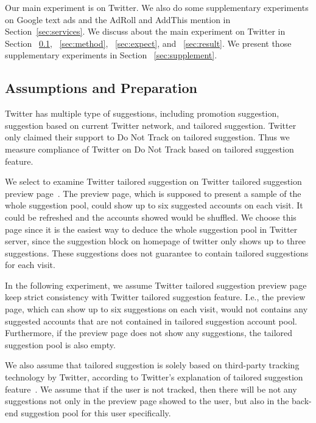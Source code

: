 \documentclass{sig-alternate}
\begin{document}
Our main experiment is on Twitter. We also do some supplementary experiments on Google text ads and the AdRoll and AddThis mention in Section~\ref{sec:services}. We discuss about the main experiment on Twitter in Section ~\ref{sec:pre}, ~\ref{sec:method}, ~\ref{sec:expect}, and ~\ref{sec:result}. We present those supplementary experiments in Section ~\ref{sec:supplement}. 

\subsection{Assumptions and Preparation} \label{sec:pre}

Twitter has multiple type of suggestions, including promotion suggestion, suggestion based on current Twitter network, and tailored suggestion. Twitter only claimed their support to Do Not Track on tailored suggestion. Thus we measure compliance of Twitter on Do Not Track based on tailored suggestion feature.

We select to examine Twitter tailored suggestion on Twitter tailored suggestion preview page~\cite{twittertailoredpreview}. The preview page, which is supposed to present a sample of the whole suggestion pool, could show up to six suggested accounts on each visit. It could be refreshed and the accounts showed would be shuffled. We choose this page since it is the easiest way to deduce the whole suggestion pool in Twitter server, since the suggestion block on homepage of twitter only shows up to three suggestions. These suggestions does not guarantee to contain tailored suggestions for each visit.

In the following experiment, we assume Twitter tailored suggestion preview page~\cite{twittertailoredpreview} keep strict consistency with Twitter tailored suggestion feature. I.e., the preview page, which can show up to six suggestions on each visit, would not contains any suggested accounts that are not contained in tailored suggestion account pool. Furthermore, if the preview page does not show any suggestions, the tailored suggestion pool is also empty.

We also assume that tailored suggestion is solely based on third-party tracking technology by Twitter, according to Twitter's explanation of tailored suggestion feature~\cite{twitterts}. We assume that if the user is not tracked, then there will be not any suggestions not only in the preview page showed to the user, but also in the back-end suggestion pool for this user specifically. 
\end{document}
